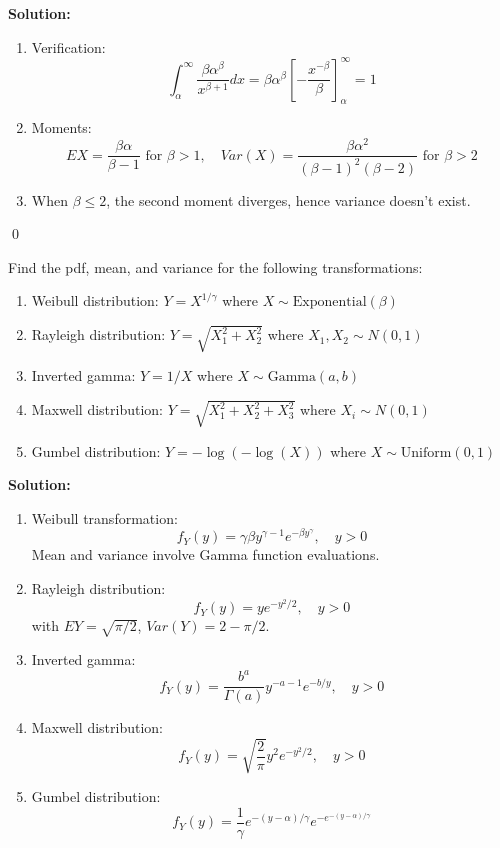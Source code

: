 \noindent\textbf{Solution:}
\begin{enumerate}[label=(\alph*)]
\item Verification:
\[
\int_\alpha^\infty \frac{\beta\alpha^\beta}{x^{\beta+1}}dx = \beta\alpha^\beta\left[-\frac{x^{-\beta}}{\beta}\right]_\alpha^\infty = 1
\]

\item Moments:
\[
EX = \frac{\beta\alpha}{\beta-1} \text{ for } \beta>1, \quad Var(X) = \frac{\beta\alpha^2}{(\beta-1)^2(\beta-2)} \text{ for } \beta>2
\]

\item When $\beta \leq 2$, the second moment diverges, hence variance doesn't exist.
\end{enumerate}


\qed
\begin{problembox}
Find the pdf, mean, and variance for the following transformations:
\begin{enumerate}[label=(\alph*)]
\item Weibull distribution: $Y = X^{1/\gamma}$ where $X \sim \text{Exponential}(\beta)$
\item Rayleigh distribution: $Y = \sqrt{X_1^2 + X_2^2}$ where $X_1, X_2 \sim N(0,1)$
\item Inverted gamma: $Y = 1/X$ where $X \sim \text{Gamma}(a,b)$
\item Maxwell distribution: $Y = \sqrt{X_1^2 + X_2^2 + X_3^2}$ where $X_i \sim N(0,1)$
\item Gumbel distribution: $Y = -\log(-\log(X))$ where $X \sim \text{Uniform}(0,1)$
\end{enumerate}
\end{problembox}

\noindent\textbf{Solution:}
\begin{enumerate}[label=(\alph*)]
\item Weibull transformation:
\[
f_Y(y) = \gamma\beta y^{\gamma-1}e^{-\beta y^\gamma}, \quad y>0
\]
Mean and variance involve Gamma function evaluations.

\item Rayleigh distribution:
\[
f_Y(y) = ye^{-y^2/2}, \quad y>0
\]
with $EY = \sqrt{\pi/2}$, $Var(Y) = 2 - \pi/2$.

\item Inverted gamma:
\[
f_Y(y) = \frac{b^a}{\Gamma(a)}y^{-a-1}e^{-b/y}, \quad y>0
\]

\item Maxwell distribution:
\[
f_Y(y) = \sqrt{\frac{2}{\pi}}y^2e^{-y^2/2}, \quad y>0
\]

\item Gumbel distribution:
\[
f_Y(y) = \frac{1}{\gamma}e^{-(y-\alpha)/\gamma}e^{-e^{-(y-\alpha)/\gamma}}
\]
\end{enumerate}



